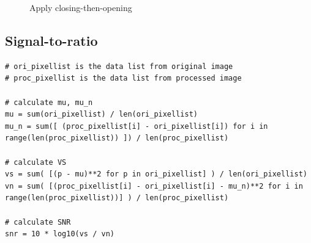 \documentclass[14pt,a4paper]{extarticle}
\begin{document}
\begin{figure}[H]
\centering
	\hfill
\caption{Apply closing-then-opening}
\end{figure}

\subsection{Signal-to-ratio}

\begin{lstlisting}
# ori_pixellist is the data list from original image
# proc_pixellist is the data list from processed image

# calculate mu, mu_n
mu = sum(ori_pixellist) / len(ori_pixellist)
mu_n = sum([ (proc_pixellist[i] - ori_pixellist[i]) for i in range(len(proc_pixellist)) ]) / len(proc_pixellist)

# calculate VS
vs = sum( [(p - mu)**2 for p in ori_pixellist] ) / len(ori_pixellist)
vn = sum( [(proc_pixellist[i] - ori_pixellist[i] - mu_n)**2 for i in range(len(proc_pixellist))] ) / len(proc_pixellist)

# calculate SNR
snr = 10 * log10(vs / vn)
\end{lstlisting}
\end{document}
